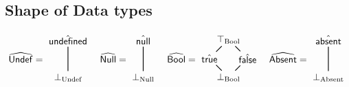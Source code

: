 \subsection{Shape of Data types}
\[
\abs{Undef} =
\begin{matrix}
  \begin{tikzpicture}
    \node (top) at (0,0) {$\aundef$};
    \node (down) at (0,-1.4) {$\bot_{\mbox{\scriptsize Undef}}$};
    \draw [black, thick, shorten <= -1pt, shorten >=-1pt] (top) -- (down);
  \end{tikzpicture}
\end{matrix}
\quad
\abs{Null} =
\begin{matrix}
  \begin{tikzpicture}
    \node (top) at (0,0) {$\anull$};
    \node (down) at (0,-1.4) {$\bot_{\mbox{\scriptsize Null}}$};
    \draw [black, thick, shorten <= -1pt, shorten >=-1pt] (top) -- (down);
  \end{tikzpicture}
\end{matrix}
\quad
\abs{Bool} =
\begin{matrix}
  \begin{tikzpicture}
    \node (top) at (0,0) {$\top_{\mbox{\scriptsize Bool}}$};
    \node (midleft) at (-0.7,-0.7) {$\atrue$};
    \node (midright) at (0.7,-0.7) {$\afalse$};
    \node (down) at (0,-1.4) {$\bot_{\mbox{\scriptsize Bool}}$};
    \draw [black, thick, shorten <= -1pt, shorten >=-1pt] (top) -- (midleft);
    \draw [black, thick, shorten <= -1pt, shorten >=-1pt] (top) -- (midright);
    \draw [black, thick, shorten <= -1pt, shorten >=-1pt] (midleft) -- (down);
    \draw [black, thick, shorten <= -1pt, shorten >=-1pt] (midright) -- (down);
  \end{tikzpicture}
\end{matrix}
\quad
\abs{Absent} =
\begin{matrix}
  \begin{tikzpicture}
    \node (top) at (0,0) {$\hat{\SF{absent}}$};
    \node (down) at (0,-1.4) {$\bot_{\mbox{\scriptsize Absent}}$};
    \draw [black, thick, shorten <= -1pt, shorten >=-1pt] (top) -- (down);
  \end{tikzpicture}
\end{matrix}
\]
